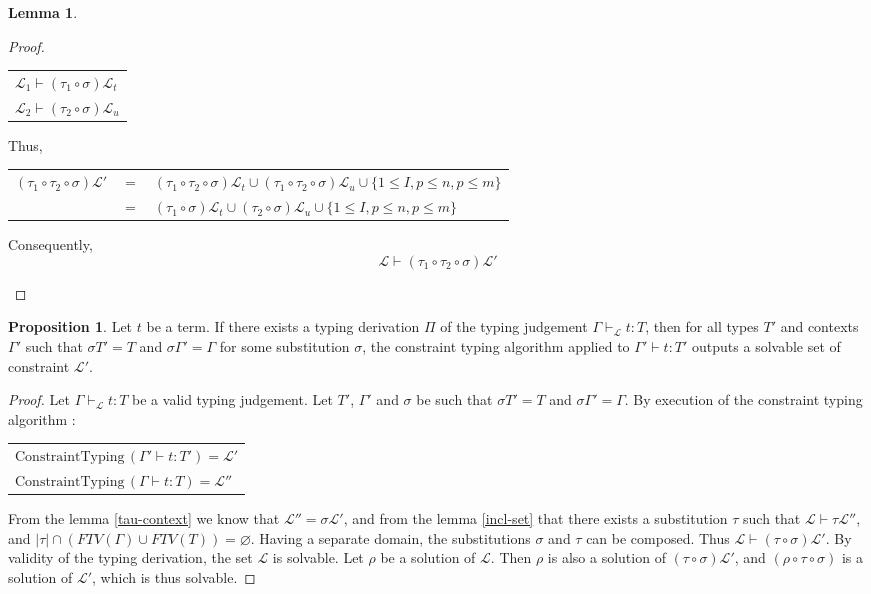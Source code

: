 \documentclass[9pt]{article}
\theoremstyle{plain}
\theoremstyle{definition}
\newtheorem{prop}{Proposition}[section]
\newtheorem{lemma}{Lemma}[section]
\begin{document}
\begin{lemma}
\begin{proof}
\begin{itemize}
\begin{center}
			 		\begin{tabular}{l}
			 			$\mathcal{L}_1 \vdash (\tau_1 \circ \sigma) \mathcal{L}_t$ \\
			 			$\mathcal{L}_2 \vdash (\tau_2 \circ \sigma) \mathcal{L}_u$
			 		\end{tabular}
			 		\end{center}
				Thus,
			 		\begin{center}
			 		\begin{tabular}{lcl}
			 			$(\tau_1 \circ \tau_2 \circ \sigma) \mathcal{L}'$ & $=$ & 
				 			$(\tau_1 \circ \tau_2 \circ \sigma) \mathcal{L}_t \cup (\tau_1 \circ \tau_2 \circ \sigma) \mathcal{L}_u \cup
				 				\{1 \le I, p \le n, p \le m\}$ \\
				 		& $=$ & $(\tau_1 \circ \sigma) \mathcal{L}_t \cup (\tau_2 \circ \sigma) \mathcal{L}_u \cup
				 				\{1 \le I, p \le n, p \le m\}$
			 		\end{tabular}
			 		\end{center}
			 	Consequently,
			 		$$ \mathcal{L} \vdash (\tau_1 \circ \tau_2 \circ \sigma) \mathcal{L'} $$
		\end{itemize}
	\end{proof}
\end{lemma}

\begin{prop} Let $t$ be a term. If there exists a typing derivation $\Pi$ of the typing judgement
	$\Gamma \vdash_\mathcal{L} t : T$, then for all types $T'$ and contexts $\Gamma'$ such that $\sigma T' = T$ and $\sigma \Gamma' = \Gamma$
	for some substitution $\sigma$, the constraint typing algorithm applied to $\Gamma' \vdash t : T'$ outputs a solvable set of
	constraint $\mathcal{L'}$.
	
	\begin{proof}
		Let $\Gamma \vdash_\mathcal{L} t : T$ be a valid typing judgement. Let $T'$, $\Gamma'$ and $\sigma$ be such that
		$\sigma T' = T$ and $\sigma \Gamma' = \Gamma$. By execution of the constraint typing algorithm :
			\begin{center}
			\begin{tabular}{l}
				$\text{ConstraintTyping} \, (\Gamma' \vdash t : T') = \mathcal{L'}$ \\
				$\text{ConstraintTyping} \, (\Gamma \vdash t : T) = \mathcal{L''}$
			\end{tabular}
			\end{center}
		From the lemma \ref{tau-context} we know that $\mathcal{L''} = \sigma \mathcal{L'}$, and from the lemma \ref{incl-set} that
		there exists a substitution $\tau$ such that $\mathcal{L} \vdash \tau \mathcal{L''}$, and
		$|\tau| \cap (FTV(\Gamma) \cup FTV(T)) = \varnothing$. Having a separate domain, the substitutions $\sigma$ and $\tau$ can be composed.
		Thus $\mathcal{L} \vdash (\tau \circ \sigma) \mathcal{L'}$.
		By validity of the typing derivation, the set $\mathcal{L}$ is solvable.
		Let $\rho$ be a solution of $\mathcal{L}$. Then $\rho$ is also a solution of $(\tau \circ \sigma) \mathcal{L'}$, and
		$(\rho \circ \tau \circ \sigma)$ is a solution of $\mathcal{L'}$, which is thus solvable.
	\end{proof}
\end{prop}
 
\end{document}
